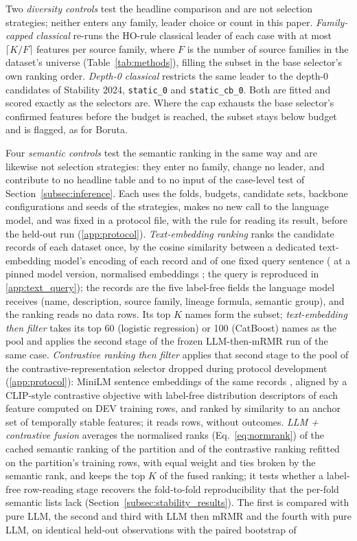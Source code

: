 \documentclass[final,5p,twocolumn]{elsarticle}
\newcommand{\Kfeat}{K}
\begin{document}
Two \emph{diversity controls} test the headline comparison and are not selection strategies; neither enters any family, leader choice or count in this paper. \emph{Family-capped classical} re-runs the HO-rule classical leader of each case with at most $\lceil \Kfeat/F\rceil$ features per source family, where $F$ is the number of source families in the dataset's universe (Table~\ref{tab:methods}), filling the subset in the base selector's own ranking order. \emph{Depth-0 classical} restricts the same leader to the depth-0 candidates of Stability 2024, \texttt{static\_0} and \texttt{static\_cb\_0}. Both are fitted and scored exactly as the selectors are. Where the cap exhausts the base selector's confirmed features before the budget is reached, the subset stays below budget and is flagged, as for Boruta.

Four \emph{semantic controls} test the semantic ranking in the same way and are likewise not selection strategies: they enter no family, change no leader, and contribute to no headline table and to no input of the case-level test of Section~\ref{subsec:inference}. Each uses the folds, budgets, candidate sets, backbone configurations and seeds of the strategies, makes no new call to the language model, and was fixed in a protocol file, with the rule for reading its result, before the held-out run (\ref{app:protocol}). \emph{Text-embedding ranking} ranks the candidate records of each dataset once, by the cosine similarity between a dedicated text-embedding model's encoding of each record and of one fixed query sentence ( at a pinned model version, normalised embeddings \cite{xiao2023bge}; the query is reproduced in \ref{app:text_query}); the records are the five label-free fields the language model receives (name, description, source family, lineage formula, semantic group), and the ranking reads no data rows. Its top $\Kfeat$ names form the subset; \emph{text-embedding then filter} takes its top 60 (logistic regression) or 100 (CatBoost) names as the pool and applies the second stage of the frozen LLM-then-mRMR run of the same case. \emph{Contrastive ranking then filter} applies that second stage to the pool of the contrastive-representation selector dropped during protocol development (\ref{app:protocol}): MiniLM sentence embeddings of the same records \cite{wang2020minilm,reimers2019}, aligned by a CLIP-style contrastive objective \cite{radford2021} with label-free distribution descriptors of each feature computed on DEV training rows, and ranked by similarity to an anchor set of temporally stable features; it reads rows, without outcomes. \emph{LLM + contrastive fusion} averages the normalised ranks (Eq.~\eqref{eq:normrank}) of the cached semantic ranking of the partition and of the contrastive ranking refitted on the partition's training rows, with equal weight and ties broken by the semantic rank, and keeps the top $\Kfeat$ of the fused ranking; it tests whether a label-free row-reading stage recovers the fold-to-fold reproducibility that the per-fold semantic lists lack (Section~\ref{subsec:stability_results}). The first is compared with pure LLM, the second and third with LLM then mRMR and the fourth with pure LLM, on identical held-out observations with the paired bootstrap of 
\end{document}
